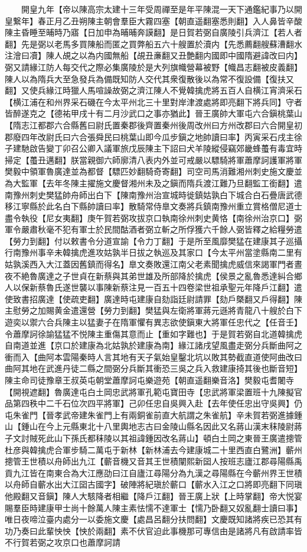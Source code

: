 　　開皇九年【帝以陳高宗太建十三年受周禪至是年平陳混一天下通鑑紀事乃以開皇繋年】春正月乙丑朔陳主朝會羣臣大霧四塞【朝直遥翻塞悉則翻】入人鼻皆辛酸陳主昏睡至晡時乃寤【日加申為晡晡奔謨翻】是日賀若弼自廣陵引兵濟江【若人者翻】先是弼以老馬多買陳船而匿之買弊船五六十艘置於瀆内【先悉薦翻艘蘇漕翻水注澮曰凟】陳人覘之以為内國無船【覘丑亷翻又丑艶翻内國即中國隋避諱改曰内】弼又請緣江防人每交代之際必集廣陵於是大列旗幟營幕被野【幟昌志翻被皮義翻】陳人以為隋兵大至急發兵為備既知防人交代其衆復散後以為常不復設備【復扶又翻】又使兵緣江時獵人馬喧譟故弼之濟江陳人不覺韓擒虎將五百人自横江宵濟采石【横江浦在和州界采石磯在今太平州北三十里對岸津渡處將即亮翻下將兵同】守者皆醉遂克之【德祐甲戌十有二月沙武口之事亦猶此】晉王廣帥大軍屯六合鎭桃葉山【隋志江都郡六合縣舊曰尉氏置秦郡後齊置秦州後周改州曰方州改郡曰六合開皇初郡廢四年改尉氏曰六合張舜民曰桃葉山即今瓜步鎭之地帥讀曰率】丙寅采石戌主徐子建馳啟告變丁卯召公卿入議軍旅戊辰陳主下詔曰犬羊陵縱侵竊郊畿蜂蠆有毒宜時掃定【蠆丑邁翻】朕當親御六師廓清八表内外並可戒嚴以驃騎將軍蕭摩訶護軍將軍樊毅中領軍魯廣達並為都督【驃匹妙翻騎奇寄翻】司空司馬消難湘州刺史施文慶並為大監軍【去年冬陳主擢施文慶督湘州未及之鎭而隋兵渡江難乃旦翻監工銜翻】遣南豫州刺史樊猛帥舟師出白下【陳南豫州治宣城時徙鎮姑孰白下城合白石疊唐武德移江寧縣於此名白下縣帥讀曰率】散騎常侍臯文奏將兵鎮南豫州重立賞格僧尼道士盡令執役【尼女夷翻】庚午賀若弼攻拔京口執南徐州刺史黄恪【南徐州治京口】弼軍令嚴肅秋毫不犯有軍士於民間酤酒者弼立斬之所俘獲六千餘人弼皆釋之給糧勞遣【勞力到翻】付以敕書令分道宣諭【令力丁翻】于是所至風靡樊猛在建康其子巡攝行南豫州事辛未韓擒虎進攻姑孰半日拔之執巡及其家口【今太平州當塗縣南二里有姑孰溪西入大江蓋因舊鎮而得名】臯文奏敗還江南父老素聞擒虎威信來謁軍門者晝夜不絶魯廣達之子世貞在新蔡與其弟世雄及所部降於擒虎【侯景之亂魯悉達糾合鄉人以保新蔡魯氏遂世襲以事陳新蔡注見一百五十四卷梁世祖承聖元年降戶江翻】遣使致書招廣達【使疏吏翻】廣達時屯建康自劾詣廷尉請罪【劾戶槩翻又戶得翻】陳主慰勞之加賜黄金遣還營【勞力到翻】樊猛與左衛將軍蔣元遜將青龍八十艘於白下遊奕以禦六合兵陳主以猛妻子在隋軍懼有異志欲使鎭東大將軍任忠代之【任音壬】令蕭摩訶徐諭猛猛不悦陳主重傷其意而止【重如字難也】于是賀若弼自北道韓擒虎自南道並進【京口於建康為北姑孰於建康為南】緣江諸戌望風盡走弼分兵斷曲阿之衝而入【曲阿本雲陽秦時人言其地有天子氣始皇鑿北坑以敗其勢截直道使阿曲改曰曲阿其地在武進丹徒二縣之間弼分兵斷其衝恐三吳之兵入救建康掎其後也斷音短】陳主命司徒豫章王叔英屯朝堂蕭摩訶屯樂遊苑【朝直遥翻樂音洛】樊毅屯耆闍寺【開視遮翻】魯廣達屯白土岡忠武將軍孔範屯寶田寺【忠武將軍梁置班十九陳擬官品第四秩中二千石位次四平將軍】己卯任忠自吳興入赴【去年使任忠出守吳興】仍屯朱雀門【晉孝武帝建朱雀門上有兩銅雀前直大航謂之朱雀航】辛未賀若弼進據鍾山【鍾山在今上元縣東北十八里輿地志古曰金陵山縣名因此又名蔣山漢末秣陵尉蔣子文討賊死此山下孫氏都秣陵以其祖諱鍾因改名蔣山】頓白土岡之東晉王廣遣摠管杜彦與韓擒虎合軍步騎二萬屯于新林【新林浦去今建康城二十里西直白鷺洲】蘄州摠管王世積以舟師出九江【蘄音機又音其王世積闡熙新囶人按班志廬江郡尋陽縣禹貢九江皆在南東合為大江應劭曰江自廬江尋陽分為九漢之尋陽縣在今蘄州界王世積以舟師自蘄水出大江囶古國字】破陣將紀瑱於蘄口【蘄水入江之口將即亮翻下同瑱他殿翻又音鎭】陳人大駭降者相繼【降戶江翻】晉王廣上狀【上時掌翻】帝大悦宴賜羣臣時建康甲士尚十餘萬人陳主素怯懦不達軍士【懦乃卧翻又奴亂翻士讀曰事】唯日夜啼泣臺内處分一以委施文慶【處昌呂翻分扶問翻】文慶既知諸將疾已恐其有功乃奏曰此輩怏怏【怏於兩翻】素不伏官迫此事機那可專信由是諸將凡有啟請率皆不行賀若弼之攻京口也蕭摩訶請